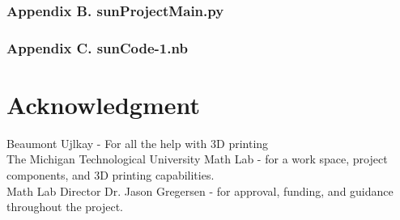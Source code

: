 \documentclass[titlepage]{article}
\begin{document}
\subsubsection*{Appendix B. sunProjectMain.py}

\subsubsection*{Appendix C. sunCode-1.nb}

\section*{Acknowledgment}
Beaumont Ujlkay - For all the help with 3D printing \\
The Michigan Technological University Math Lab - for a work space, project components, and 3D printing capabilities. \\
Math Lab Director Dr. Jason Gregersen - for approval, funding, and guidance throughout the project. 

\newpage

\printbibliography
\end{document}
